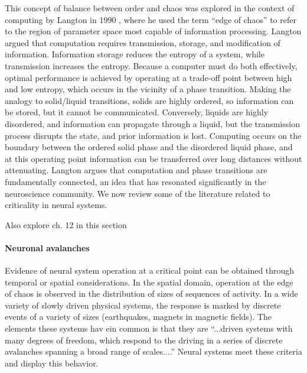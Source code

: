 \documentclass[twocolumn]{article}
\newcommand{\onlinecite}[1]{\hspace{-1 ex} \nocite{#1}\citenum{#1}}
\begin{document}
This concept of balance between order and chaos was explored in the context of computing by Langton in 1990 \cite{la1990}, where he used the term ``edge of chaos'' to refer to the region of parameter space most capable of information processing. Langton argued that computation requires transmission, storage, and modification of information. Information storage reduces the entropy of a system, while transmission increases the entropy. Because a computer must do both effectively, optimal performance is achieved by operating at a trade-off point between high and low entropy, which occurs in the vicinity of a phase transition. Making the analogy to solid/liquid transitions, solids are highly ordered, so information can be stored, but it cannot be communicated. Conversely, liquids are highly disordered, and information can propagate through a liquid, but the transmission process disrupts the state, and prior information is lost. Computing occurs on the boundary between the ordered solid phase and the disordered liquid phase, and at this operating point information can be transferred over long distances without attenuating. Langton argues that computation and phase transitions are fundamentally connected, an idea that has resonated significantly in the neuroscience community. We now review some of the literature related to criticality in neural systems.

\vspace{3em}
Also explore \onlinecite{sp2010} ch. 12 in this section 

\paragraph{Neuronal avalanches}
Evidence of neural system operation at a critical point can be obtained through temporal or spatial considerations. In the spatial domain, operation at the edge of chaos is observed in the distribution of sizes of sequences of activity. In a wide variety of slowly driven physical systems, the response is marked by discrete events of a variety of sizes \cite{seda2001} (earthquakes, magnets in magnetic fields). The elements these systems hav ein common is that they are ``...driven systems with many degrees of freedom, which respond to the driving in a series of discrete avalanches spanning a broad range of scales....'' \cite{seda2001} Neural systems meet these criteria and display this behavior.
\end{document}
